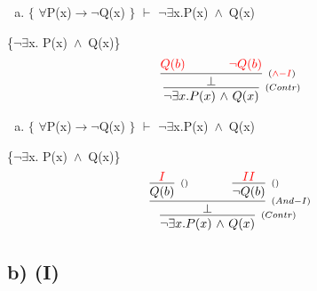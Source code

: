 \documentclass[aspectratio=43]{beamer}
\newcommand{\ria}{$\rightarrow$}
\newcommand{\fall}{$\forall$}
\newcommand{\ex}{$\exists$}
\newcommand{\nao}{$\neg$}
\newcommand{\nex}{\nao\ex}
\newcommand{\andd}{$\wedge$}
\begin{document}
    \begin{frame}[fragile]
    	
    	\begin{enumerate}[b)]
			
			\item $\{$ \fall P(x)\ria \nao Q(x) $\}$ $\vdash$ \nex  x.P(x)\ \andd\ Q(x) \\ 
			
		\end{enumerate}
        \{\nex  x. P(x)\ \andd\ Q(x)\}
        \vspace{95pt}
        \[
        \begin{array}{c}
		
        	\infer[_{(Contr)}]
            {$\nex$  x. P(x)\ $\andd$\ Q(x)}
            {\infer[_{(\textcolor{red}{\land-I})}] 
            	{\bot}
                { \textcolor{red}{ Q(b) \hspace{35pt} \neg Q(b)}}
        	}
		\end{array}
        \]
        
	\end{frame}
    
    \begin{frame}[fragile]
    	
    	\begin{enumerate}[b)]
			
			\item $\{$ \fall P(x)\ria \nao Q(x) $\}$ $\vdash$ \nex  x.P(x)\ \andd\ Q(x) \\ 
			
		\end{enumerate}
        \{\nex  x. P(x)\ \andd\ Q(x)\}
        \vspace{100pt}
        \[
        \begin{array}{c}
		
        	\infer[_{(Contr)}]
            {$\nex$  x. P(x)\ $\andd$\ Q(x)}
            {\infer[_{(And-I)}] 
            	{\bot}
                {\infer[_{()}]
                	{Q(b)}
                    {\textcolor{red}{I}}
                \hspace{35pt} 
                \infer[_{()}]
                	{$\nao$Q(b)}
                    {\textcolor{red}{II}}
                }
        	}
		\end{array}
        \]
        
	\end{frame}
    
    \subsection{b) (I)}
    
\end{document}
